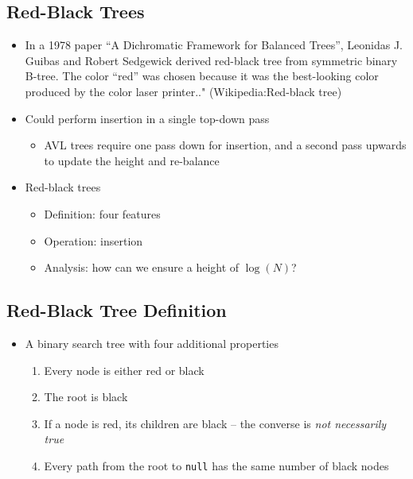 \documentclass[
  10pt,
  english,
  letterpaper,
,tablecaptionabove
]{scrartcl}
\newcommand{\passthrough}[1]{#1}
\providecommand{\tightlist}{%
  \setlength{\itemsep}{0pt}\setlength{\parskip}{0pt}}
\begin{document}
\hypertarget{red-black-trees}{%
\subsection{Red-Black Trees}\label{red-black-trees}}

\begin{itemize}
\tightlist
\item
  In a 1978 paper \enquote{A Dichromatic Framework for Balanced Trees},
  Leonidas J. Guibas and Robert Sedgewick derived red-black tree from
  symmetric binary B-tree. The color \enquote{red} was chosen because it
  was the best-looking color produced by the color laser printer.."
  (Wikipedia:Red-black tree)
\item
  Could perform insertion in a single top-down pass

  \begin{itemize}
  \tightlist
  \item
    AVL trees require one pass down for insertion, and a second pass
    upwards to update the height and re-balance
  \end{itemize}
\item
  Red-black trees

  \begin{itemize}
  \tightlist
  \item
    Definition: four features
  \item
    Operation: insertion
  \item
    Analysis: how can we ensure a height of \(\log(N)\)?
  \end{itemize}
\end{itemize}

\hypertarget{red-black-tree-definition}{%
\subsection{Red-Black Tree Definition}\label{red-black-tree-definition}}

\begin{itemize}
\tightlist
\item
  A binary search tree with four additional properties

  \begin{enumerate}
  \def\labelenumi{\arabic{enumi}.}
  \tightlist
  \item
    Every node is either red or black
  \item
    The root is black
  \item
    If a node is red, its children are black -- the converse is
    \emph{not necessarily true}
  \item
    Every path from the root to \passthrough{\lstinline!null!} has the
    same number of black nodes
  \end{enumerate}
\end{itemize}
\end{document}
